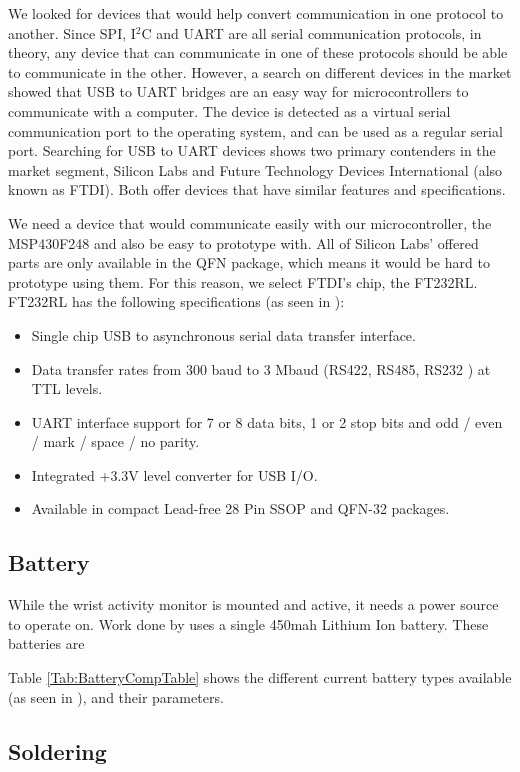 We looked for devices that would help convert communication in one protocol to another. Since SPI, I$^2$C and UART are all serial communication protocols, in theory, any device that can communicate in one of these protocols should be able to communicate in the other. However, a search on different devices in the market showed that USB to UART bridges are an easy way for microcontrollers to communicate with a computer. The device is detected as a virtual serial communication port to the operating system, and can be used as a regular serial port. Searching for USB to UART devices shows two primary contenders in the market segment, Silicon Labs and Future Technology Devices International (also known as FTDI). Both offer devices that have similar features and specifications. 

We need a device that would communicate easily with our microcontroller, the MSP430F248 and also be easy to prototype with. All of Silicon Labs' offered parts are only available in the QFN package, which means it would be hard to prototype using them. For this reason, we select FTDI's chip, the FT232RL. FT232RL has the following specifications (as seen in \cite{FT232Datasheet}):

\begin{itemize}
	\item Single chip USB to asynchronous serial data transfer interface.
	\item Data transfer rates from 300 baud to 3 Mbaud (RS422, RS485, RS232 ) at TTL levels.
	\item UART interface support for 7 or 8 data bits, 1 or 2 stop bits and odd / even / mark / space / no parity.
	\item Integrated +3.3V level converter for USB I/O.
	\item Available in compact Lead-free 28 Pin SSOP and QFN-32 packages.
\end{itemize}

\subsection{Battery}
\label{Sec:Battery}

While the wrist activity monitor is mounted and active, it needs a power source to operate on. Work done by \cite{Web:ShimmerHome} uses a single 450mah Lithium Ion battery. These batteries are 


Table \ref{Tab:BatteryCompTable} shows the different current battery types available (as seen in \cite{Web:BatteryTable}), and their parameters.





\label{Sec:CircuitDesign}
\label{Sec:Software}

\subsection{Soldering}
\label{Sec:Soldering}
